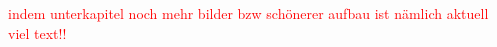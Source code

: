 \documentclass[11pt, a4paper, german]{article}
\newcommand{\TM}{TechnologyMapping }
\begin{document}
 \textcolor{red}{ indem unterkapitel noch mehr bilder bzw schönerer aufbau ist nämlich aktuell viel text!!}
 

\end{document}
